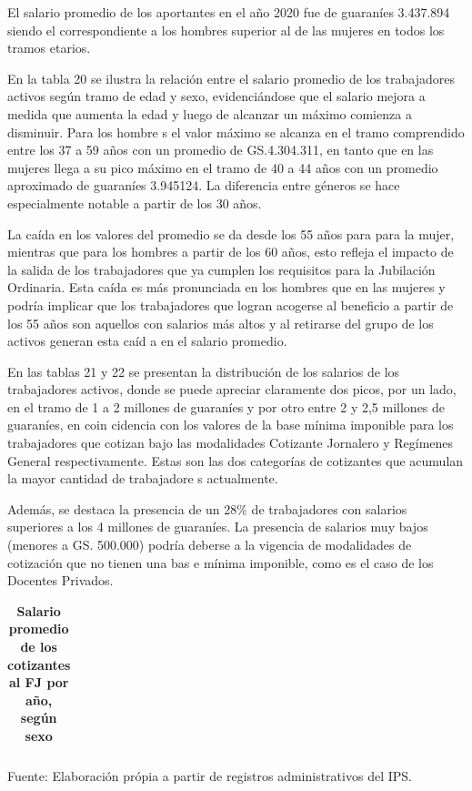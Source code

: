 El salario promedio de los aportantes en el año 2020 fue de guaraníes
3.437.894 siendo el correspondiente a los hombres superior al de las
mujeres en todos los tramos etarios.

En la tabla 20 se ilustra la relación entre el salario promedio de los
trabajadores activos según tramo de edad y sexo, evidenciándose que el
salario mejora a medida que aumenta la edad y luego de alcanzar un
máximo comienza a disminuir. Para los hombre s el valor máximo se
alcanza en el tramo comprendido entre los 37 a 59 años con un promedio
de GS.4.304.311, en tanto que en las mujeres llega a su pico máximo en
el tramo de 40 a 44 años con un promedio aproximado de guaraníes
3.945124. La diferencia entre géneros se hace especialmente notable a
partir de los 30 años.

La caída en los valores del promedio se da desde los 55 años para para
la mujer, mientras que para los hombres a partir de los 60 años, esto
refleja el impacto de la salida de los trabajadores que ya cumplen los
requisitos para la Jubilación Ordinaria. Esta caída es más pronunciada
en los hombres que en las mujeres y podría implicar que los trabajadores
que logran acogerse al beneficio a partir de los 55 años son aquellos
con salarios más altos y al retirarse del grupo de los activos generan
esta caíd a en el salario promedio.

En las tablas 21 y 22 se presentan la distribución de los salarios de
los trabajadores activos, donde se puede apreciar claramente dos picos,
por un lado, en el tramo de 1 a 2 millones de guaraníes y por otro entre
2 y 2,5 millones de guaraníes, en coin cidencia con los valores de la
base mínima imponible para los trabajadores que cotizan bajo las
modalidades Cotizante Jornalero y Regímenes General respectivamente.
Estas son las dos categorías de cotizantes que acumulan la mayor
cantidad de trabajadore s actualmente.

Además, se destaca la presencia de un 28\% de trabajadores con salarios
superiores a los 4 millones de guaraníes. La presencia de salarios muy
bajos (menores a GS. 500.000) podría deberse a la vigencia de
modalidades de cotización que no tienen una bas e mínima imponible, como
es el caso de los Docentes Privados.

\begin{table}[H]
\begin{center}
\scriptsize     
\caption{\bf{Salario promedio de los cotizantes al FJ por año, según sexo}}
\begin{tabular}{l|rrrrrrrrrrrrr}

\end{tabular}
                    \item Fuente: Elaboración própia a partir de registros administrativos del IPS.
\end{center}
\end{table}

